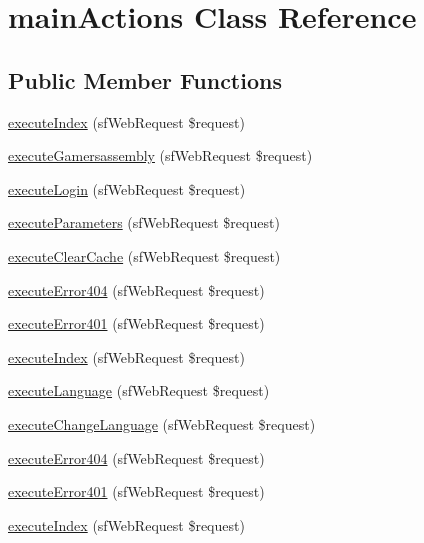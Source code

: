 \hypertarget{classmain_actions}{\section{main\-Actions Class Reference}
\label{classmain_actions}
}
\subsection*{Public Member Functions}
\begin{DoxyCompactItemize}
\item 
\hyperlink{classmain_actions_a948cc911eb1d9f77990be54af3b2080f}{execute\-Index} (sf\-Web\-Request \$request)
\item 
\hyperlink{classmain_actions_ab6b234f26c872df6f91ccd06be03b3d5}{execute\-Gamersassembly} (sf\-Web\-Request \$request)
\item 
\hyperlink{classmain_actions_a657ae0479166d3b9d3ff0407ba5c4ac9}{execute\-Login} (sf\-Web\-Request \$request)
\item 
\hyperlink{classmain_actions_abaa656dd06d59a73c2ef2aac13c7487f}{execute\-Parameters} (sf\-Web\-Request \$request)
\item 
\hyperlink{classmain_actions_a0c90b48fe8f89b5134d052308dacb3fc}{execute\-Clear\-Cache} (sf\-Web\-Request \$request)
\item 
\hyperlink{classmain_actions_a466941d77cab9fe696812b8b34d36e78}{execute\-Error404} (sf\-Web\-Request \$request)
\item 
\hyperlink{classmain_actions_a232ea78d5ca9a86efdd48b4981bc1645}{execute\-Error401} (sf\-Web\-Request \$request)
\item 
\hyperlink{classmain_actions_a948cc911eb1d9f77990be54af3b2080f}{execute\-Index} (sf\-Web\-Request \$request)
\item 
\hyperlink{classmain_actions_a81c95377a406d8e52f929fa05688c8bd}{execute\-Language} (sf\-Web\-Request \$request)
\item 
\hyperlink{classmain_actions_afb3815c3031f8fe9b4bd1a9739d43c00}{execute\-Change\-Language} (sf\-Web\-Request \$request)
\item 
\hyperlink{classmain_actions_a466941d77cab9fe696812b8b34d36e78}{execute\-Error404} (sf\-Web\-Request \$request)
\item 
\hyperlink{classmain_actions_a232ea78d5ca9a86efdd48b4981bc1645}{execute\-Error401} (sf\-Web\-Request \$request)
\item 
\hyperlink{classmain_actions_a948cc911eb1d9f77990be54af3b2080f}{execute\-Index} (sf\-Web\-Request \$request)

\end{DoxyCompactItemize}
